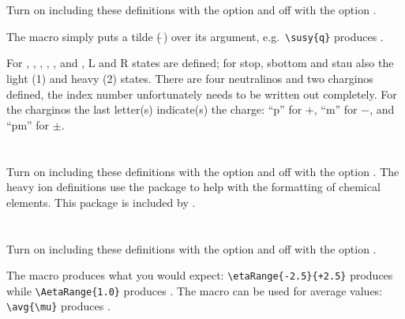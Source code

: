 \newpage
\section{}

Turn on including these definitions with the option  and off with the option .

The macro  simply puts a tilde (\(\tilde{\ }\)) over its argument,
e.g.\ \verb|\susy{q}| produces .

For , , , \slepton, \sel, \smu and
\stau, L and R states are defined; for stop, sbottom and stau also the
light (1) and heavy (2) states.
There are four neutralinos and two charginos defined,
the index number unfortunately needs to be written out completely.
For the charginos the last letter(s) indicate(s) the charge:
\enquote{p} for \(+\), \enquote{m} for \(-\), and \enquote{pm} for \(\pm\).




\newpage
\section{}

Turn on including these definitions with the option  and off with the option .
The heavy ion definitions use the package  to help with the formatting of chemical elements.
This package is included by .



%


\newpage
\section{}

Turn on including these definitions with the option  and off with the option .



\noindent The macro  produces what you would expect:
\verb|\etaRange{-2.5}{+2.5}| produces  while
\verb|\AetaRange{1.0}| produces .
The macro  can be used for average values:
\verb|\avg{\mu}| produces \avg{\mu}.


